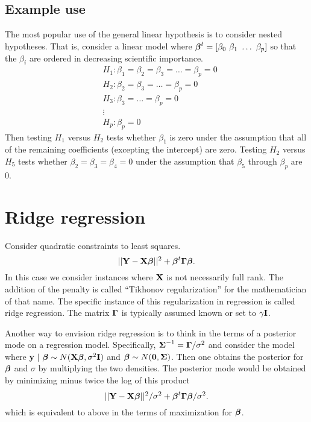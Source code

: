 \subsection{Example use}
The most popular use of the general linear hypothesis is to consider nested hypotheses. 
That is, consider a linear model where $\boldsymbol{\beta}^t = [\beta_0 ~ \beta_1 ~ \ldots ~\beta_p]$
so that the $\beta_i$ are ordered in decreasing scientific importance.
\begin{align*}
 & H_1 : \beta_1  = \beta_2  = \beta_3 = \ldots = \beta_p = 0 \\
 & H_2 :            \beta_2  = \beta_3 = \ldots = \beta_p = 0 \\
 & H_3 :                       \beta_3 = \ldots = \beta_p = 0 \\
 & \vdots \\
 & H_p : \beta_p = 0
\end{align*}
Then testing $H_1$ versus $H_2$ tests whether $\beta_1$ is zero under the assumption
that all of the remaining coefficients (excepting the intercept) are zero. 
Testing $H_2$ versus $H_5$ tests whether $\beta_2 = \beta_3 = \beta_4 = 0$
under the assumption that $\beta_5$ through $\beta_p$ are 0. 



\section{Ridge regression}

Consider quadratic constraints to least squares.
$$
||\mathbf{Y} - \mathbf{X} \boldsymbol{\beta}||^2 + \boldsymbol{\beta}^t \boldsymbol{\Gamma} \boldsymbol{\beta}.
$$
In this case we consider instances where $\mathbf{X}$ is not necessarily full rank. The
addition of the penalty is called ``Tikhonov regularization'' for the mathematician of
that name. The specific instance of this regularization in regression is called ridge
regression. The matrix $\boldsymbol{\Gamma}$ is typically assumed known or set to $\gamma \mathbf{I}$. 

Another way to envision ridge regression is to think in the terms of a posterior mode 
on a regression model. Specifically, $\boldsymbol{\Sigma}^{-1} = \boldsymbol{\Gamma} / \sigma^2$ and consider the model
where $\mathbf{y} ~|~ \boldsymbol{\beta} \sim N(\mathbf{X} \boldsymbol{\beta}, \sigma^2 \mathbf{I})$ and $\boldsymbol{\beta} \sim N(\mathbf{0}, \boldsymbol{\Sigma})$. 
Then one obtains the posterior for $\boldsymbol{\beta}$ and $\sigma$ by multiplying the two densities. The
posterior mode would be obtained by minimizing minus twice the log of this product
$$
||\mathbf{Y} - \mathbf{X} \boldsymbol{\beta}||^2 / \sigma^2 + \boldsymbol{\beta}^t \boldsymbol{\Gamma} \boldsymbol{\beta} / \sigma^2.
$$
which is equivalent to above in the terms of maximization for $\boldsymbol{\beta}$.

